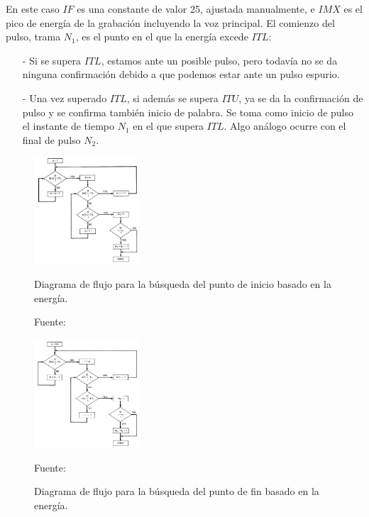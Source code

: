 \begin{enumerate}
\begin{enumerate}
En este caso $IF$ es una constante de valor 25, ajustada manualmente, e $IMX$ es el pico de energía de la grabación incluyendo la voz principal. El comienzo del pulso, trama $N_{1}$, es el punto en el que la energía excede $ITL$:

\begin{enumerate}
\item[-]Si se supera $ITL$, estamos ante un posible pulso, pero todavía no se da ninguna confirmación debido a que podemos estar ante un pulso espurio.
\item[-]Una vez superado $ITL$, si además se supera $ITU$, ya se da la confirmación de pulso y se confirma también inicio de palabra. Se toma como inicio de pulso el instante de tiempo $N_{1}$ en el que supera $ITL$. Algo análogo ocurre con el final de pulso $N_{2}$.
\end{enumerate}
\vskip 0.5cm
\newpage
\begin{figure}[ht]
\begin{center}
\includegraphics[width=0.35\textwidth]{Imagenes/Cap2/image028}
\end{center}
\begin{center}
\vskip -0.5cm
\caption{\small{Diagrama de flujo para la búsqueda del punto de inicio basado en la energía.}}
\label{fig:figura2.27}
{\small{Fuente: \cite{rabiner}}}
\end{center}

\begin{center}
\includegraphics[width=0.35\textwidth]{Imagenes/Cap2/image029}
\end{center}
\begin{center}
\vskip -0.5cm
\caption{\small{Diagrama de flujo para la búsqueda del punto de fin basado en la energía.}}
\label{fig:figura2.28}
{\small{Fuente: \cite{rabiner}}}
\end{center}
\end{figure}


\end{enumerate}
\end{enumerate}
